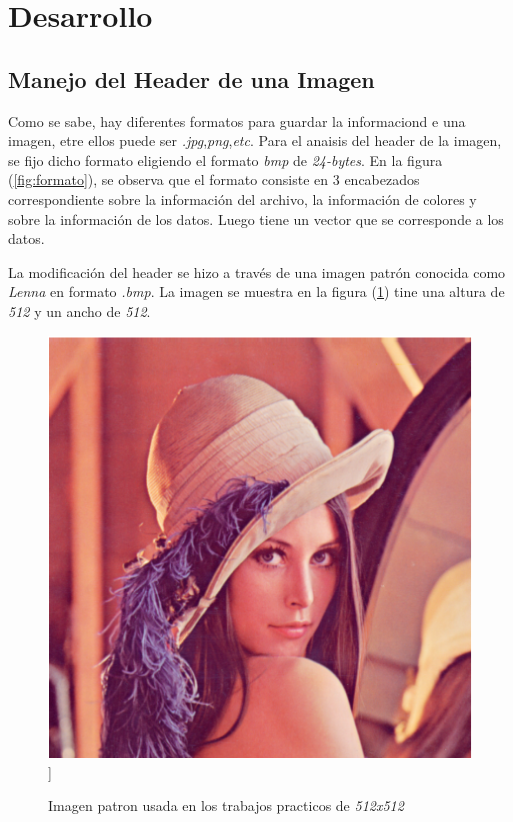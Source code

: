 \section{Desarrollo}

\subsection{Manejo del Header de una Imagen}

	Como se sabe, hay diferentes formatos para guardar la informaciond e una imagen, etre ellos puede ser \textit{.jpg},\textit{png},\textit{etc}. Para el anaisis del header de la imagen, se fijo dicho formato eligiendo el formato \textit{bmp} de \textit{24-bytes}. En la figura (\ref{fig:formato}), se observa que el formato consiste en 3 encabezados correspondiente sobre la información del archivo, la información de colores y sobre la información de los datos. Luego tiene un vector que se corresponde a los datos. 

	La modificación del header se hizo a través de una imagen patrón conocida como \textit{Lenna} en formato \textit{.bmp}. La imagen se muestra en la figura (\ref{fig:lenna}) tine una altura de \textit{512} y un ancho de \textit{512}.
	
\begin{figure}[H]
	\centering
	\includegraphics[scale=0.5]{imagenes/lenna.png}]
	\caption{Imagen patron usada en los trabajos practicos de \textit{512x512}\label{fig:lenna}}
\end{figure}
	

